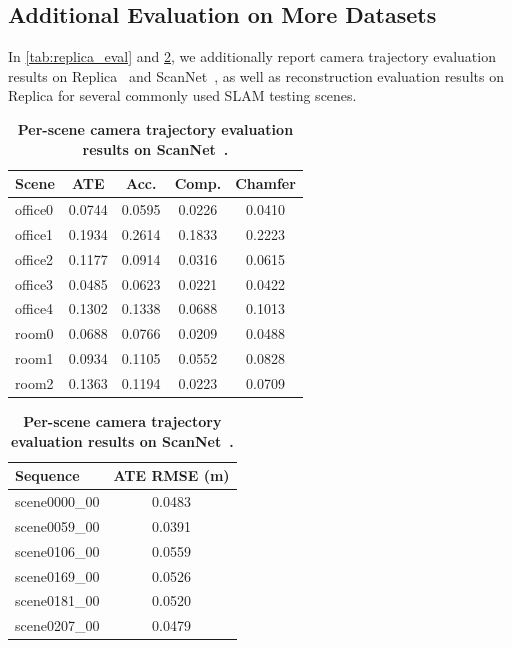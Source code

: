 \subsection{Additional Evaluation on More Datasets}
In \cref{tab:replica_eval} and \cref{tab:scannet_eval}, we additionally report camera trajectory evaluation results on Replica~\cite{replica19arxiv} and ScanNet~\cite{dai2017scannet}, as well as reconstruction evaluation results on Replica for several commonly used SLAM testing scenes.


\begin{table}[h]
    \centering
    \begin{tabular}{l c c c c}
        \toprule
        \textbf{Scene} & \textbf{ATE} & \textbf{Acc.} & \textbf{Comp.} & \textbf{Chamfer} \\
        \midrule
        office0 & 0.0744 & 0.0595 & 0.0226 & 0.0410 \\
        office1 & 0.1934 & 0.2614 & 0.1833 & 0.2223 \\
        office2 & 0.1177 & 0.0914 & 0.0316 & 0.0615 \\
        office3 & 0.0485 & 0.0623 & 0.0221 & 0.0422 \\
        office4 & 0.1302 & 0.1338 & 0.0688 & 0.1013 \\
        room0   & 0.0688 & 0.0766 & 0.0209 & 0.0488 \\
        room1   & 0.0934 & 0.1105 & 0.0552 & 0.0828 \\
        room2   & 0.1363 & 0.1194 & 0.0223 & 0.0709 \\
        \bottomrule
    \end{tabular}
    \caption{\bf Per-scene evaluation results on Replica~\cite{replica19arxiv}.}
    \label{tab:replica_eval}
    \vspace{1.5em}


\setlength{\tabcolsep}{25pt}
    \centering
    \begin{tabular}{l c}
        \toprule
        \textbf{Sequence} & \textbf{ATE RMSE (m)} \\
        \midrule
        scene0000\_00 & 0.0483 \\
        scene0059\_00 & 0.0391 \\
        scene0106\_00 & 0.0559 \\
        scene0169\_00 & 0.0526 \\
        scene0181\_00 & 0.0520 \\
        scene0207\_00 & 0.0479 \\
        \bottomrule
    \end{tabular}
    \caption{\bf Per-scene camera trajectory evaluation results on ScanNet~\cite{dai2017scannet}.}
        \label{tab:scannet_eval}
\end{table}


